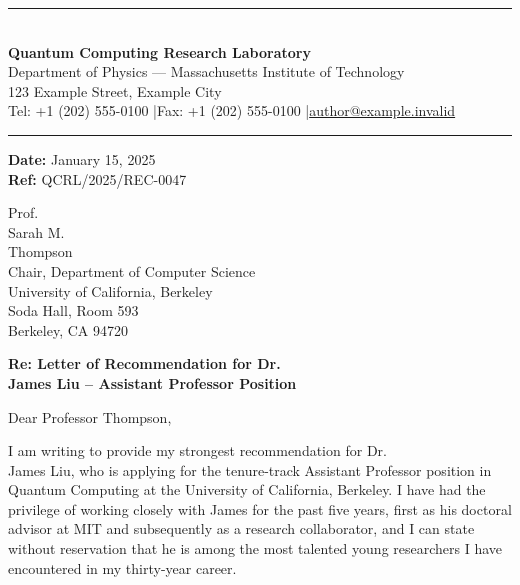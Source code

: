 \documentclass[12pt,a4paper]{article}
\begin{document}
\begin{center}
{\color{headercolor}\rule{\textwidth}{2pt}}\\[12pt]
{\fontsize{20}{24}\selectfont\bfseries\color{headercolor} Quantum Computing Research Laboratory}\\[4pt]
{\large Department of Physics --- Massachusetts Institute of Technology}\\[4pt]
{\small 123 Example Street, Example City}\\[2pt]
{\small Tel: +1 (202) 555-0100 \quad|\quad Fax: +1 (202) 555-0100 \quad|\quad \href{mailto:author@example.invalid}{author@example.invalid}}\\[8pt]
{\color{headercolor}\rule{\textwidth}{0.5pt}}
\end{center}

\vspace{1cm}

\begin{flushright}
\textbf{Date:} January 15, 2025\\
\textbf{Ref:} QCRL/2025/REC-0047
\end{flushright}

\vspace{0.5cm}

Prof.\\ Sarah M.\\ Thompson\\
Chair, Department of Computer Science\\
University of California, Berkeley\\
Soda Hall, Room 593\\
Berkeley, CA 94720

\vspace{0.5cm}

\textbf{Re: Letter of Recommendation for Dr.\\ James Liu -- Assistant Professor Position}

\vspace{0.3cm}

Dear Professor Thompson,

I am writing to provide my strongest recommendation for Dr.\\ James Liu, who is applying for the tenure-track Assistant Professor position in Quantum Computing at the University of California, Berkeley. I have had the privilege of working closely with James for the past five years, first as his doctoral advisor at MIT and subsequently as a research collaborator, and I can state without reservation that he is among the most talented young researchers I have encountered in my thirty-year career.
\end{document}
